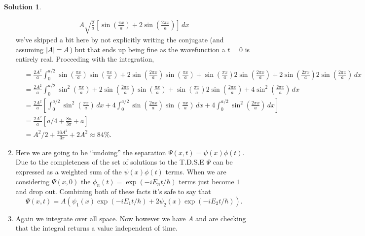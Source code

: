 \documentclass[10pt]{article}
\theoremstyle{definition}
\newtheorem{soln}{Solution}
\begin{document}
\begin{soln}
\begin{enumerate}[label=(\alph*)]
\begin{align*}
            A\sqrt{\frac{2}{a}}\left[\sin\left(\frac{\pi x}{a}\right)+2\sin\left(\frac{2\pi x}{a}\right)\right]\,dx
          \end{align*}
          we've skipped a bit here by not explicitly writing the conjugate (and assuming $\abs{A}=A$) but that ends up being fine as the wavefunction a $t=0$
          is entirely real. Proceeding with the integration,
          \begin{align*}                                                                                                                                                                                                                  \\
             & =\frac{2A^2}{a}\int_{0}^{a/2}\sin\left(\frac{\pi x}{a}\right)\sin\left(\frac{\pi x}{a}\right)+2\sin\left(\frac{2\pi x}{a}\right)\sin\left(\frac{\pi x}{a}\right) + \sin\left(\frac{\pi x}{a}\right)2\sin\left(\frac{2\pi x}{a}\right)+2\sin\left(\frac{2\pi x}{a}\right)2\sin\left(\frac{2\pi x}{a}\right)\,dx \\
             & =\frac{2A^2}{a}\int_{0}^{a/2}\sin^2\left(\frac{\pi x}{a}\right)+2\sin\left(\frac{2\pi x}{a}\right)\sin\left(\frac{\pi x}{a}\right) + \sin\left(\frac{\pi x}{a}\right)2\sin\left(\frac{2\pi x}{a}\right)+4\sin^2\left(\frac{2\pi x}{a}\right)\,dx                                                               \\
             & =\frac{2A^2}{a}\left[\int_{0}^{a/2}\sin^2\left(\frac{\pi x}{a}\right)\,dx +4\int_{0}^{a/2}\sin\left(\frac{2\pi x}{a}\right)\sin\left(\frac{\pi x}{a}\right)\,dx +4\int_{0}^{a/2}\sin^2\left(\frac{2\pi x}{a}\right)\,dx\right] \\
             & =\frac{2A^2}{a}\left[a/4 +\frac{8a}{3\pi} + a\right] \\
             & =A^2/2 +\frac{16A^2}{3\pi} + 2A^2\approx84\%.
          \end{align*}
    \item Here we are going to be ``undoing'' the separation $\Psi(x,t)=\psi(x)\phi(t)$. Due to the completeness of the 
    set of solutions to the T.D.S.E $\Psi$ can be expressed as a weighted sum of the $\psi(x)\phi(t)$ terms. When we are considering 
    $\Psi(x,0)$ the $\phi_n(t)=\exp(-iE_nt/\hbar)$ terms just become $1$ and drop out. Combining both of these facts it's safe to say that
    $$\Psi(x,t)=A(\psi_1(x)\exp(-iE_1t/\hbar)+2\psi_2(x)\exp(-iE_2t/\hbar)).$$
    \item Again we integrate over all space. Now however we have $A$ and are checking that the integral returns a value independent of time.

\end{enumerate}
\end{soln}
\end{document}
